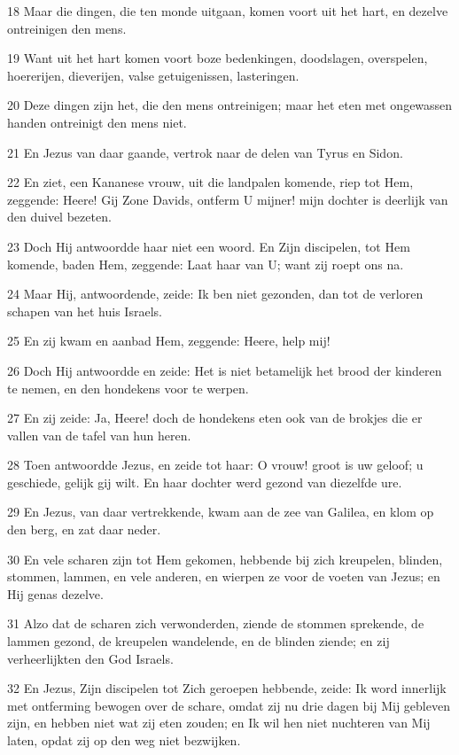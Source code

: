 \par 18 Maar die dingen, die ten monde uitgaan, komen voort uit het hart, en dezelve ontreinigen den mens.
\par 19 Want uit het hart komen voort boze bedenkingen, doodslagen, overspelen, hoererijen, dieverijen, valse getuigenissen, lasteringen.
\par 20 Deze dingen zijn het, die den mens ontreinigen; maar het eten met ongewassen handen ontreinigt den mens niet.
\par 21 En Jezus van daar gaande, vertrok naar de delen van Tyrus en Sidon.
\par 22 En ziet, een Kananese vrouw, uit die landpalen komende, riep tot Hem, zeggende: Heere! Gij Zone Davids, ontferm U mijner! mijn dochter is deerlijk van den duivel bezeten.
\par 23 Doch Hij antwoordde haar niet een woord. En Zijn discipelen, tot Hem komende, baden Hem, zeggende: Laat haar van U; want zij roept ons na.
\par 24 Maar Hij, antwoordende, zeide: Ik ben niet gezonden, dan tot de verloren schapen van het huis Israels.
\par 25 En zij kwam en aanbad Hem, zeggende: Heere, help mij!
\par 26 Doch Hij antwoordde en zeide: Het is niet betamelijk het brood der kinderen te nemen, en den hondekens voor te werpen.
\par 27 En zij zeide: Ja, Heere! doch de hondekens eten ook van de brokjes die er vallen van de tafel van hun heren.
\par 28 Toen antwoordde Jezus, en zeide tot haar: O vrouw! groot is uw geloof; u geschiede, gelijk gij wilt. En haar dochter werd gezond van diezelfde ure.
\par 29 En Jezus, van daar vertrekkende, kwam aan de zee van Galilea, en klom op den berg, en zat daar neder.
\par 30 En vele scharen zijn tot Hem gekomen, hebbende bij zich kreupelen, blinden, stommen, lammen, en vele anderen, en wierpen ze voor de voeten van Jezus; en Hij genas dezelve.
\par 31 Alzo dat de scharen zich verwonderden, ziende de stommen sprekende, de lammen gezond, de kreupelen wandelende, en de blinden ziende; en zij verheerlijkten den God Israels.
\par 32 En Jezus, Zijn discipelen tot Zich geroepen hebbende, zeide: Ik word innerlijk met ontferming bewogen over de schare, omdat zij nu drie dagen bij Mij gebleven zijn, en hebben niet wat zij eten zouden; en Ik wil hen niet nuchteren van Mij laten, opdat zij op den weg niet bezwijken.
